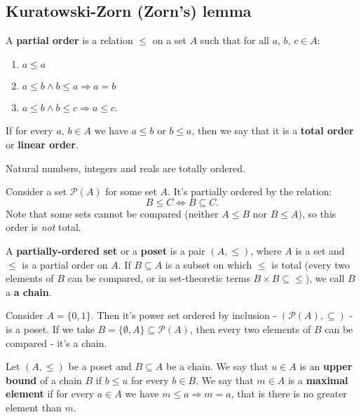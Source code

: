 \subsection{Kuratowski-Zorn (Zorn's) lemma}
\begin{definition}
  A \textbf{partial order} is a relation $\le$ on a set $A$ such that for all $a,\,b,\,c\in A$:
  \begin{enumerate}
    \item $a\le a$
    \item $a\le b \wedge b\le a\Rightarrow a=b$
    \item $a\le b\wedge b\le c\Rightarrow a\le c$.
  \end{enumerate}
  If for every $a,\,b\in A$ we have $a\le b$ or $b\le a$, then we say that it is a \textbf{total order} or \textbf{linear order}.
\end{definition}

\begin{example}
  Natural numbers, integers and reals are totally ordered.
\end{example}

\begin{example}
  Consider a set $\mathcal P(A)$ for some set $A$. It's partially ordered by the relation:
  $$B\le C \Leftrightarrow B\subseteq C.$$
  Note that some sets cannot be compared (neither $A\le B$ nor $B\le A$), so this order is \textit{not} total.
\end{example}

\begin{definition}
  A \textbf{partially-ordered set} or a \textbf{poset} is a pair $(A, \le)$, where $A$ is a set and $\le$ is a partial order on $A$. If $B\subseteq A$ is a subset on which
  $\le$ is total (every two elements of $B$ can be compared, or in set-theoretic terms $B\times B\subseteq \le$), we call $B$ a \textbf{a chain}.
\end{definition}

\begin{example}
  Consider $A=\{0,1\}$. Then it's power set ordered by inclusion - $(\mathcal P(A), \subseteq)$ - is a poset. If we take $B=\{\emptyset,A\}\subseteq \mathcal P(A)$,
  then every two elements of $B$ can be compared - it's a chain.
\end{example}

\begin{definition}
  Let $(A, \le)$ be a poset and $B\subseteq A$ be a chain. We say that $u\in A$ is an \textbf{upper bound} of a chain $B$ if $b\le u$ for every $b\in B$.
  We say that $m\in A$ is a \textbf{maximal element} if for every $a\in A$ we have $m\le a\Rightarrow m=a$, that is there is no greater element than $m$.
\end{definition}


